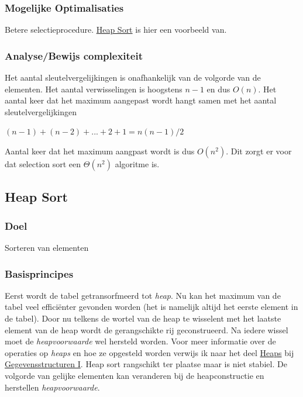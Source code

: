 \documentclass{article}
\begin{document}
\subsubsection{Mogelijke Optimalisaties} %
\label{sub:sel_sort_mogelijke_optimalisaties}
Betere selectieprocedure. \hyperref[sub:heap_sort]{Heap Sort} is hier een voorbeeld van.

\subsubsection{Analyse/Bewijs complexiteit} %
\label{sub:sel_sort_analyse_bewijs_complexiteit}
Het aantal sleutelvergelijkingen is onafhankelijk van de volgorde van de elementen. Het aantal verwisselingen is hoogstens $n-1$ en dus $O(n)$. Het aantal keer dat het maximum aangepast wordt hangt samen met het aantal sleutelvergelijkingen 
\begin{center}
$(n-1) + (n-2) + ... + 2 + 1 = n(n-1)/2$
\end{center}
Aantal keer dat het maximum aangpast wordt is dus $O(n^2)$. Dit zorgt er voor dat selection sort een $\Theta(n^2)$ algoritme is.

\subsection{Heap Sort} %
\label{sub:heap_sort}
\subsubsection{Doel} %
\label{sub:heap_sort_doel}
Sorteren van elementen

\subsubsection{Basisprincipes} %
\label{sub:heap_sort_basisprincipes}
Eerst wordt de tabel getransorfmeerd tot \textit{heap}. Nu kan het maximum van de tabel veel efficiënter gevonden worden (het is namelijk altijd het eerste element in de tabel). Door nu telkens de wortel van de heap te wisselent met het laatste element van de heap wordt de gerangschikte rij geconstrueerd. Na iedere wissel moet de \textit{heapvoorwaarde} wel hersteld worden. Voor meer informatie over de operaties op \textit{heaps} en hoe ze opgesteld worden verwijs ik naar het deel \hyperref[sub:heaps]{Heaps} bij \hyperref[gegI]{Gegevensstructuren I}. Heap sort rangschikt ter plaatse maar is niet stabiel. De volgorde van gelijke elementen kan veranderen bij de heapconstructie en herstellen \textit{heapvoorwaarde}.
\end{document}
